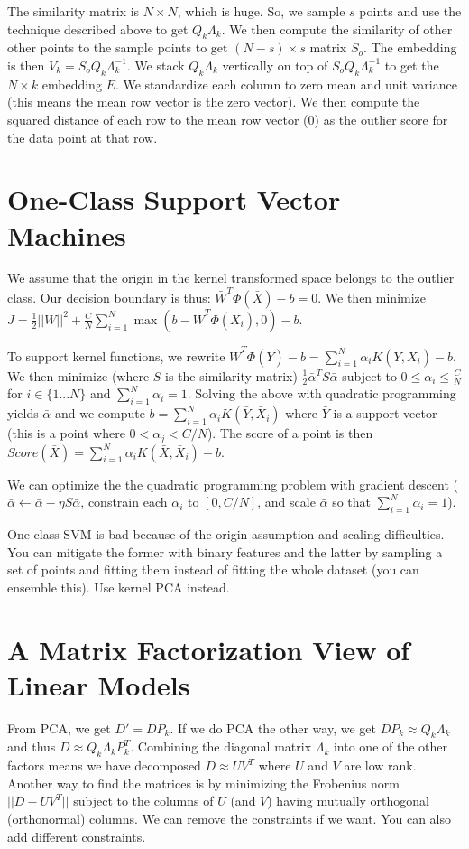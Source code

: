 \documentclass[a4paper]{article}
\begin{document}
The similarity matrix is $N \times N$, which is huge. So, we sample $s$ points
and use the technique described above to get $Q_k \Lambda_k$. We then compute
the similarity of other other points to the sample points to get
$(N - s) \times s$ matrix $S_o$. The embedding is then
$V_k = S_o Q_k \Lambda_k^{-1}$. We stack $Q_k \Lambda_k$ vertically on top
of $S_o Q_k \Lambda_k^{-1}$ to get the $N \times k$ embedding $E$. We
standardize each column to zero mean and unit variance (this means the mean
row vector is the zero vector). We then compute the squared distance of each
row to the mean row vector (0) as the outlier score for the data point at that
row.

\section{One-Class Support Vector Machines}
We assume that the origin in the kernel transformed space belongs to the outlier
class. Our decision boundary is thus: $\bar{W}^T \Phi(\bar{X}) - b = 0$. We then
minimize $J = \frac{1}{2} ||\bar{W}||^2 + \frac{C}{N} \sum_{i=1}^{N}{\max{(b - \bar{W}^T \Phi(\bar{X}_i), 0)} - b}$.

To support kernel functions, we rewrite $\bar{W}^T \Phi(\bar{Y}) - b =
\sum_{i=1}^{N}{\alpha_i K(\bar{Y}, \bar{X}_i)} - b$. We then minimize (where
$S$ is the similarity matrix) $\frac{1}{2} \bar{\alpha}^T S \bar{\alpha}$ subject
to $0 \leq \alpha_i \leq \frac{C}{N}$ for $i \in \{1...N\}$ and $\sum_{i=1}^{N}{
\alpha_i} = 1$. Solving the above with quadratic programming yields $\bar{\alpha}$
and we compute $b = \sum_{i=1}^{N}{\alpha_i K(\bar{Y}, \bar{X}_i)}$ where
$\bar{Y}$ is a support vector (this is a point where $0 < \alpha_j < C/N$). The
score of a point is then $Score(\bar{X}) = \sum_{i=1}^{N}{\alpha_i K(\bar{X},
\bar{X}_i)} - b$.

We can optimize the the quadratic programming problem with gradient descent
($\bar{\alpha} \gets \bar{\alpha} - \eta S \bar{\alpha}$, constrain each
$\alpha_i$ to $[0, C/N]$, and scale $\bar{\alpha}$ so that $\sum_{i=1}^{N}{
\alpha_i} = 1$).

One-class SVM is bad because of the origin assumption and scaling difficulties.
You can mitigate the former with binary features and the latter by sampling
a set of points and fitting them instead of fitting the whole dataset (you
can ensemble this). Use kernel PCA instead.

\section{A Matrix Factorization View of Linear Models}
From PCA, we get $D' = DP_k$. If we do PCA the other way, we get $DP_k \approx
Q_k \Lambda_k$ and thus $D \approx Q_k \Lambda_k P_k^T$. Combining the
diagonal matrix $\Lambda_k$ into one of the other factors means we have
decomposed $D \approx UV^T$ where $U$ and $V$ are low rank. Another way to find
the matrices is by minimizing the Frobenius norm $||D - UV^T||$ subject to
the columns of $U$ (and $V$) having mutually orthogonal (orthonormal) columns.
We can remove the constraints if we want. You can also add different
constraints.
\end{document}
